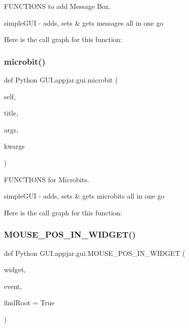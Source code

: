 \begin{DoxyVerb}
F\+U\+N\+C\+T\+I\+O\+NS to add Message Box. 

\begin{DoxyVerb}simpleGUI - adds, sets & gets messages all in one go \end{DoxyVerb}
 Here is the call graph for this function\+:
\mbox{\label{class_python_01_g_u_i_1_1appjar_1_1gui_aa8d8ccb547c3369c468f49d6dbc78147}} 
\subsubsection{\texorpdfstring{microbit()}{microbit()}}
{\footnotesize\ttfamily def Python G\+U\+I.\+appjar.\+gui.\+microbit (\begin{DoxyParamCaption}\item[{}]{self,  }\item[{}]{title,  }\item[{}]{args,  }\item[{}]{kwargs }\end{DoxyParamCaption})}



F\+U\+N\+C\+T\+I\+O\+NS for Microbits. 

\begin{DoxyVerb}simpleGUI - adds, sets & gets microbits all in one go\end{DoxyVerb}
 Here is the call graph for this function\+:
\mbox{\label{class_python_01_g_u_i_1_1appjar_1_1gui_a8678fdbd7032d104cc192e2cfd256a8d}} 
\subsubsection{\texorpdfstring{M\+O\+U\+S\+E\+\_\+\+P\+O\+S\+\_\+\+I\+N\+\_\+\+W\+I\+D\+G\+E\+T()}{MOUSE\_POS\_IN\_WIDGET()}}
{\footnotesize\ttfamily def Python G\+U\+I.\+appjar.\+gui.\+M\+O\+U\+S\+E\+\_\+\+P\+O\+S\+\_\+\+I\+N\+\_\+\+W\+I\+D\+G\+ET (\begin{DoxyParamCaption}\item[{}]{widget,  }\item[{}]{event,  }\item[{}]{find\+Root = {\ttfamily True} }\end{DoxyParamCaption})\hspace{0.3cm}{\ttfamily [static]}}


\end{DoxyVerb}
